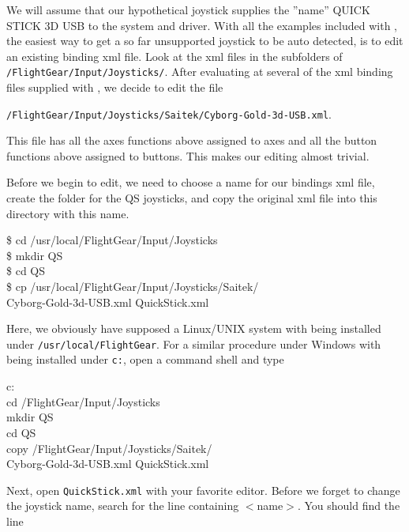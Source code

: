 We will assume that our hypothetical joystick supplies the ''name'' QUICK STICK 3D USB to the system and driver. With all the examples included with \FlightGear{}, the easiest way to get a so far unsupported joystick to be auto detected, is to edit an existing binding xml file.  Look at the xml files in the subfolders of \texttt{/FlightGear/Input/Joysticks/}. After evaluating at several of the xml binding files supplied with \FlightGear{}, we decide to edit the file

\noindent
 \texttt{/FlightGear/Input/Joysticks/Saitek/Cyborg-Gold-3d-USB.xml}. 
 
 \noindent
  This file has all the axes functions above assigned to axes and all the button functions above assigned to buttons.  This makes our editing almost trivial.

Before we begin to edit, we need to choose a name for our bindings xml file, create the folder for the QS joysticks, and copy the original xml file into this directory with this name.
\medskip


\begin{ttfamily}
\noindent
\$ cd /usr/local/FlightGear/Input/Joysticks\\
\$ mkdir QS\\
\$ cd QS\\
\$ cp  /usr/local/FlightGear/Input/Joysticks/Saitek/\\
Cyborg-Gold-3d-USB.xml  QuickStick.xml
\end{ttfamily}
\medskip

\noindent
Here, we obviously have supposed a Linux/UNIX system with \FlightGear{} being installed under \texttt{/usr/local/FlightGear}. For a similar procedure under Windows with \FlightGear{} being installed under \texttt{c:\FlightGear}, open a command shell and type
\medskip

\begin{ttfamily}
\noindent
c:\\
cd /FlightGear/Input/Joysticks\\
mkdir QS\\
cd QS\\
copy  /FlightGear/Input/Joysticks/Saitek/\\
Cyborg-Gold-3d-USB.xml  QuickStick.xml
\end{ttfamily}
\medskip

\noindent
Next, open \texttt{QuickStick.xml} with your favorite editor.  Before we forget to change the joystick name, search for the line containing $<$name$>$.  You should find the line
\medskip

